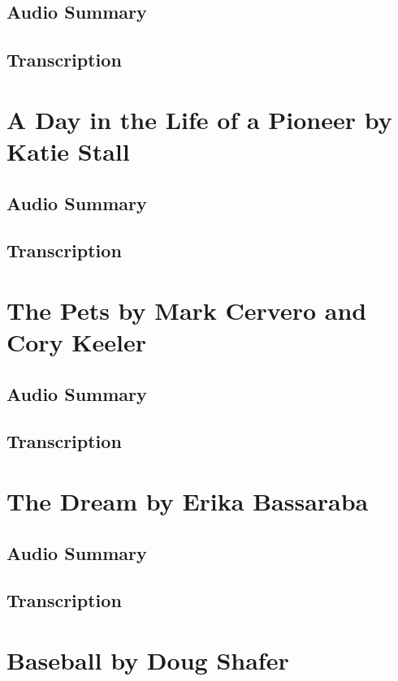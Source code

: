 \subsection{Audio Summary}

\subsection{Transcription}

\section{A Day in the Life of a Pioneer by Katie Stall}

\subsection{Audio Summary}

\subsection{Transcription}

\section{The Pets by Mark Cervero and Cory Keeler}

\subsection{Audio Summary}

\subsection{Transcription}

\section{The Dream by Erika Bassaraba}

\subsection{Audio Summary}

\subsection{Transcription}

\section{Baseball by Doug Shafer}

